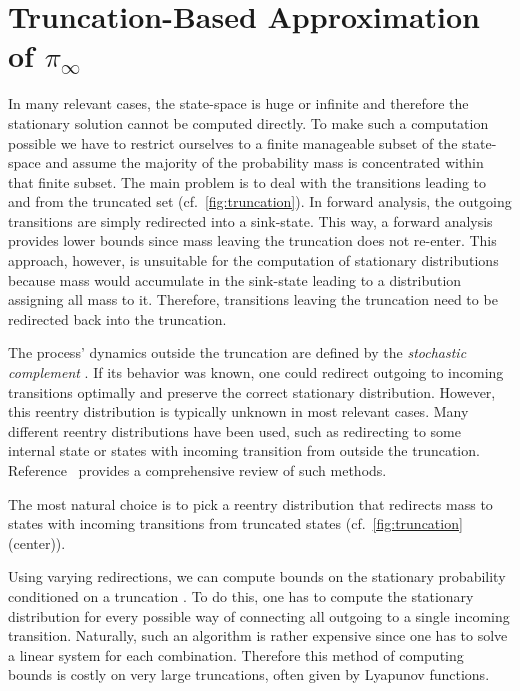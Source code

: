 \section{Truncation-Based Approximation of $\pi_{\infty}$}\label{sec:statagg:fsp}
In many relevant cases, the state-space is huge or infinite and therefore the stationary solution cannot be computed directly.
To make such a computation possible we have to restrict ourselves to a finite manageable subset of the state-space and assume the majority of the probability mass is concentrated within that finite subset.
The main problem is to deal with the transitions leading to and from the truncated set (cf.\ \autoref{fig:truncation}).
In forward analysis, the outgoing transitions are simply redirected into a sink-state.
This way, a forward analysis provides lower bounds since mass leaving the truncation does not re-enter.
This approach, however, is unsuitable for the computation of stationary distributions because mass would accumulate in the sink-state leading to a distribution assigning all mass to it.
Therefore, transitions leaving the truncation need to be redirected back into the truncation.

The process' dynamics outside the truncation are defined by the \emph{stochastic complement} \cite{spieler2014numerical}.
If its behavior was known, one could redirect outgoing to incoming transitions optimally and preserve the correct stationary distribution.
However, this reentry distribution is typically unknown in most relevant cases.
Many different reentry distributions have been used, such as redirecting to some internal state or states with incoming transition from outside the truncation.
Reference~\cite{kuntz2021approximations} provides a comprehensive review of such methods.

The most natural choice is to pick a reentry distribution that redirects mass to states with incoming transitions from truncated states (cf.\ \autoref{fig:truncation} (center)).

Using varying redirections, we can compute bounds on the stationary probability conditioned on a truncation \cite[(Thm. 14)]{spieler2014numerical}.
To do this, one has to compute the stationary distribution for every possible way of connecting all outgoing to a single incoming transition.
Naturally, such an algorithm is rather expensive since one has to solve a linear system for each combination.
Therefore this method of computing bounds is costly on very large truncations, often given by Lyapunov functions.

